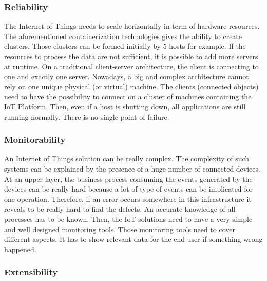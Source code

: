 \documentclass[11pt]{article}
\begin{document}
\subsubsection{Reliability}

The Internet of Things needs to scale horizontally in term of hardware resources. The aforementioned containerization technologies gives the ability to create clusters. Those clusters can be formed initially by 5 hosts for example. If the resources to process the data are not sufficient, it is possible to add more servers at runtime. On a traditional client-server architecture, the client is connecting to one and exactly one server. Nowadays, a big and complex architecture cannot rely on one unique physical (or virtual) machine. The clients (connected objects) need to have the possibility to connect on a cluster of machines containing the IoT Platform. Then, even if a host is shutting down, all applications are still running normally. There is no single point of failure.

\subsubsection{Monitorability}

An Internet of Things solution can be really complex. The complexity of such systems can be explained by the presence of a huge number of connected devices. At an upper layer, the business process consuming the events generated by the devices can be really hard because a lot of type of events can be implicated for one operation. Therefore, if an error occurs somewhere in this infrastructure it reveals to be really hard to find the defects. An accurate knowledge of all processes has to be known. Then, the IoT solutions need to have a very simple and well designed monitoring tools. Those monitoring tools need to cover different aspects. It has to show relevant data for the end user if something wrong happened. 

\subsubsection{Extensibility}
\end{document}
